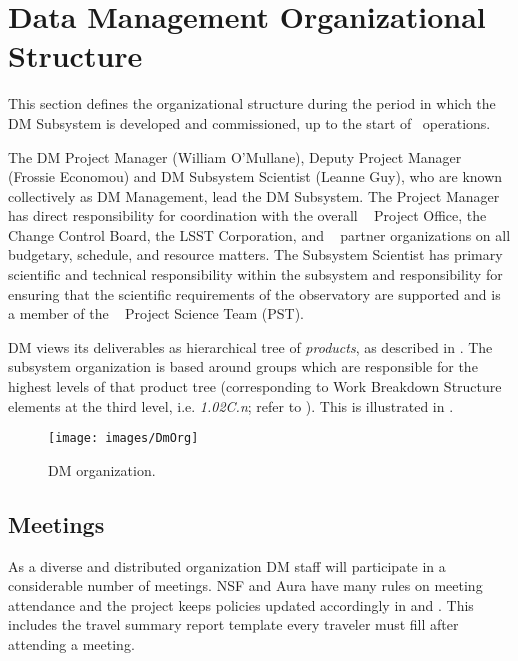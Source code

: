 \section{Data Management Organizational Structure}

This section defines the organizational structure during the period in which the DM  Subsystem is developed and commissioned, up to the start of \VRO ~operations.

The DM Project Manager (William O'Mullane), Deputy Project Manager (Frossie Economou) and DM  Subsystem Scientist (Leanne Guy), who are known collectively as DM  Management, lead the DM  Subsystem.
The Project Manager has direct responsibility for coordination with the overall \VRO~ Project Office, the \VRO~ Change Control Board, the LSST Corporation, and \VRO~ partner organizations on all budgetary, schedule, and resource matters.
The Subsystem Scientist has primary scientific and technical responsibility within the subsystem and responsibility for ensuring that the scientific requirements of the observatory are supported and is a member of the \VRO~ Project Science Team (PST).

DM  views its deliverables as hierarchical tree of \textit{products}, as described in .
The subsystem organization is based around groups which are responsible for the highest levels of that product tree (corresponding to Work Breakdown Structure elements at the third level, i.e. \textit{1.02C.n}; refer to ).
This is illustrated in .

\begin{figure}[htbp]
\begin{center}
 \texttt{[image: images/DmOrg]}
\caption{DM  organization. \label{fig:dmorg}}
\end{center}
\end{figure}

\subsection {Meetings} \label{sect:meetings}

As a diverse and distributed organization DM staff will participate in a considerable number of meetings.
NSF and Aura have many rules on meeting attendance and the project keeps policies updated accordingly in  and . This includes the travel summary report template  every traveler must fill after attending a meeting.

